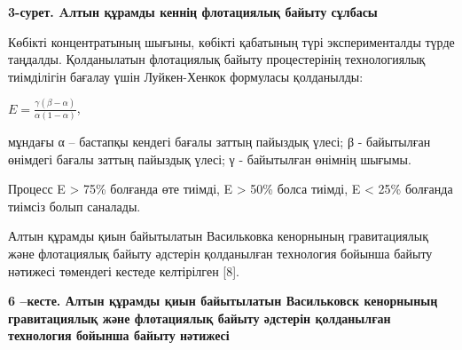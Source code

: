 {\bfseries 3-сурет. Aлтын құрамды кеннің флотациялық байыту сұлбасы}

Көбікті концентратының шығыны, көбікті қабатының түрі эксперименталды
түрде таңдалды. Қолданылатын флотациялық байыту процестерінің
технологиялық тиімділігін бағалау үшін Луйкен-Хенкок формуласы
қолданылды:

\(E = \frac{\gamma(\beta - \alpha)}{\alpha(1 - \alpha)}\),

мұндағы α -- бастапқы кендегі бағалы заттың пайыздық үлесі; β -
байытылған өнімдегі бағалы заттың пайыздық үлесі; γ - байытылған өнімнің
шығымы.

Процесс E \textgreater{} 75\% болғанда өте тиімді, E \textgreater{} 50\%
болса тиімді, E \textless{} 25\% болғанда тиімсіз болып саналады.

Алтын құрамды қиын байытылатын Васильковка кенорнының гравитациялық және
флотациялық байыту әдстерін қолданылған технология бойынша байыту
нәтижесі төмендегі кестеде келтірілген {[}8{]}.

{\bfseries 6 --кесте. Алтын құрамды қиын байытылатын Васильковск кенорнының
гравитациялық және флотациялық байыту әдстерін қолданылған технология
бойынша байыту нәтижесі}


